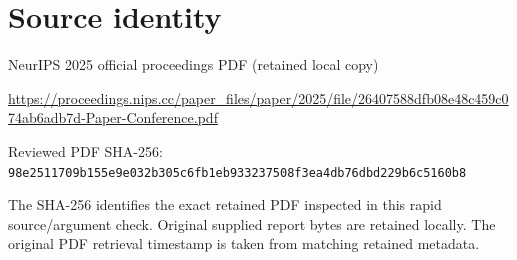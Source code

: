 \documentclass[11pt]{article}
\begin{document}
\section*{Source identity}

NeurIPS 2025 official proceedings PDF (retained local copy)

\url{https://proceedings.nips.cc/paper_files/paper/2025/file/26407588dfb08e48c459c074ab6adb7d-Paper-Conference.pdf}

Reviewed PDF SHA-256: \nolinkurl{98e2511709b155e9e032b305c6fb1eb933237508f3ea4db76dbd229b6c5160b8}

The SHA-256 identifies the exact retained PDF inspected in this rapid source/argument check. Original supplied report bytes are retained locally. The original PDF retrieval timestamp is taken from matching retained metadata.
\end{document}
